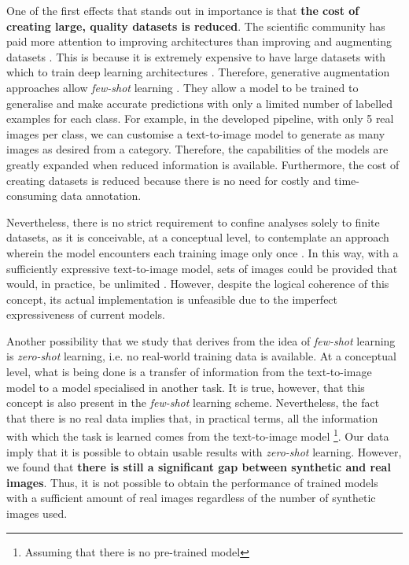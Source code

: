 One of the first effects that stands out in importance is that \textbf{the cost of creating large, quality datasets is reduced}. The scientific community has paid more attention to improving architectures than improving and augmenting datasets \cite{ghiasi2021simple}. This is because it is extremely expensive to have large datasets with which to train deep learning architectures \cite{yang2022image}. Therefore, generative augmentation approaches allow \textit{few-shot} learning \cite{wang2020generalizing}. They allow a model to be trained to generalise and make accurate predictions with only a limited number of labelled examples for each class. For example, in the developed pipeline, with only 5 real images per class, we can customise a text-to-image model to generate as many images as desired from a category. Therefore, the capabilities of the models are greatly expanded when reduced information is available. Furthermore, the cost of creating datasets is reduced because there is no need for costly and time-consuming data annotation.

Nevertheless, there is no strict requirement to confine analyses solely to finite datasets, as it is conceivable, at a conceptual level, to contemplate an approach wherein the model encounters each training image only once \cite{parisi2019continual}. In this way, with a sufficiently expressive text-to-image model, sets of images could be provided that would, in practice, be unlimited \cite{sariyildiz2023fake}. However, despite the logical coherence of this concept, its actual implementation is unfeasible due to the imperfect expressiveness of current models.

Another possibility that we study that derives from the idea of \textit{few-shot} learning is \textit{zero-shot} learning, i.e. no real-world training data is available. At a conceptual level, what is being done is a transfer of information from the text-to-image model to a model specialised in another task. It is true, however, that this concept is also present in the \textit{few-shot} learning scheme. Nevertheless, the fact that there is no real data implies that, in practical terms, all the information with which the task is learned comes from the text-to-image model \footnote{Assuming that there is no pre-trained model}. Our data imply that it is possible to obtain usable results with \textit{zero-shot} learning. However, we found that \textbf{there is still a significant gap between synthetic and real images}. Thus, it is not possible to obtain the performance of trained models with a sufficient amount of real images regardless of the number of synthetic images used.

